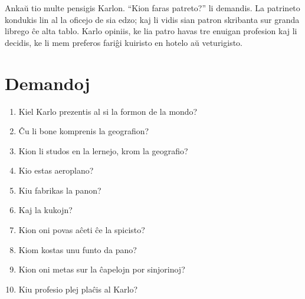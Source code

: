 Ankaŭ tio multe pensigis Karlon. ``Kion faras patreto?'' li demandis. La patrineto kondukis lin al la oficejo de sia edzo; kaj li vidis sian patron skribanta sur granda librego ĉe alta tablo. Karlo opiniis, ke lia patro havas tre enuigan profesion kaj li decidis, ke li mem preferos fariĝi kuiristo en hotelo aŭ veturigisto.

\newpage

\section*{Demandoj}

\begin{enumerate}
    \item  Kiel Karlo prezentis al si la formon de la mondo?
    \item  Ĉu li bone komprenis la geografion?
    \item  Kion li studos en la lernejo, krom la geografio?
    \item  Kio estas aeroplano?
    \item  Kiu fabrikas la panon?
    \item  Kaj la kukojn?
    \item  Kion oni povas aĉeti ĉe la spicisto?
    \item  Kiom kostas unu funto da pano?
    \item  Kion oni metas sur la ĉapelojn por sinjorinoj?
    \item  Kiu profesio plej plaĉis al Karlo?
\end{enumerate}

